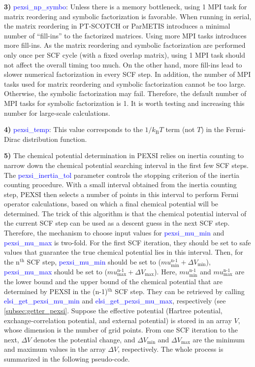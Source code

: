 \documentclass{report}
\begin{document}
\textbf{3)} \textcolor{blue}{pexsi\_np\_symbo}:  Unless there is a memory bottleneck, using 1 MPI task for matrix reordering and symbolic factorization is favorable.  When running in serial, the matrix reordering in PT-SCOTCH or ParMETIS introduces a minimal number of ``fill-ins'' to the factorized matrices.  Using more MPI tasks introduces more fill-ins.  As the matrix reordering and symbolic factorization are performed only once per SCF cycle (with a fixed overlap matrix), using 1 MPI task should not affect the overall timing too much.  On the other hand, more fill-ins lead to slower numerical factorization in every SCF step.  In addition, the number of MPI tasks used for matrix reordering and symbolic factorization cannot be too large.  Otherwise, the symbolic factorization may fail.  Therefore, the default number of MPI tasks for symbolic factorization is 1.  It is worth testing and increasing this number for large-scale calculations.

\textbf{4)} \textcolor{blue}{pexsi\_temp}:  This value corresponds to the $1/k_\text{B} T$ term (not $T$) in the Fermi-Dirac distribution function.

\textbf{5)} The chemical potential determination in PEXSI relies on inertia counting to narrow down the chemical potential searching interval in the first few SCF steps.  The \textcolor{blue}{pexsi\_inertia\_tol} parameter controls the stopping criterion of the inertia counting procedure.  With a small interval obtained from the inertia counting step, PEXSI then selects a number of points in this interval to perform Fermi operator calculations, based on which a final chemical potential will be determined.  The trick of this algorithm is that the chemical potential interval of the current SCF step can be used as a descent guess in the next SCF step.  Therefore, the mechanism to choose input values for \textcolor{blue}{pexsi\_mu\_min} and \textcolor{blue}{pexsi\_mu\_max} is two-fold.  For the first SCF iteration, they should be set to safe values that guarantee the true chemical potential lies in this interval.  Then, for the n$^\text{th}$ SCF step, \textcolor{blue}{pexsi\_mu\_min} should be set to ($mu_\text{min}^\text{n-1} + \Delta V_\text{min}$), \textcolor{blue}{pexsi\_mu\_max} should be set to ($mu_\text{max}^\text{n-1} + \Delta V_\text{max}$).  Here, $mu_\text{min}^\text{n-1}$ and $mu_\text{max}^\text{n-1}$ are the lower bound and the upper bound of the chemical potential that are determined by PEXSI in the (n-1)$^\text{th}$ SCF step.  They can be retrieved by calling \textcolor{blue}{elsi\_get\_pexsi\_mu\_min} and \textcolor{blue}{elsi\_get\_pexsi\_mu\_max}, respectively (see \ref{subsec:getter_pexsi}.  Suppose the effective potential (Hartree potential, exchange-correlation potential, and external potential) is stored in an array $V$, whose dimension is the number of grid points.  From one SCF iteration to the next, $\Delta V$ denotes the potential change, and $\Delta V_\text{min}$ and $\Delta V_\text{max}$ are the minimum and maximum values in the array $\Delta V$, respectively.  The whole process is summarized in the following pseudo-code.
\end{document}
